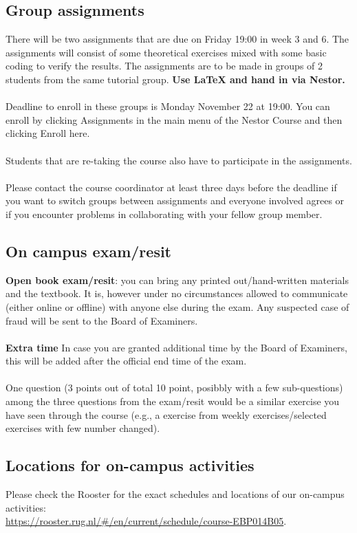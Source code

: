 \documentclass[openany]{article}
\begin{document}
\subsection{Group assignments}
There will be two assignments that are due on Friday
19:00 in week 3 and 6. The assignments will consist of some theoretical
exercises mixed with some basic coding to verify the results. The assignments
are to be made in groups of 2 students from the same tutorial group. \textbf{Use LaTeX and hand in via Nestor.} \\~\\
Deadline
to enroll in these groups is Monday November 22 at 19:00. You can
enroll by clicking Assignments in the main menu of the Nestor Course and
then clicking Enroll here.\\~\\
Students that are re-taking the course also have to participate in
the assignments.\\~\\
Please contact the course coordinator at least three days before the deadline if 
you want to switch groups between assignments and everyone involved agrees or
if you encounter problems in collaborating with your fellow group member.  

\subsection{On campus exam/resit}
\textbf{Open book exam/resit}: you can bring any printed out/hand-written materials and the textbook. It is, however under no circumstances allowed to
communicate (either online or offline) with anyone else during the exam.
Any suspected case of fraud will be sent to the Board of Examiners.\\~\\
\textbf{Extra time } In case you are granted additional time by the Board of Examiners, this will be added after the official end time of the exam.\\~\\
One question (3 points out of total 10 point, posibbly with a few sub-questions) among the three questions from the exam/resit would be a similar exercise you have seen through the course (e.g., a exercise from weekly exercises/selected exercises with few number changed). 

\subsection{Locations for on-campus activities}
Please check the Rooster for the exact schedules and locations of our on-campus activities:\\ \href{https://rooster.rug.nl/#/en/current/schedule/course-EBP014B05}{https://rooster.rug.nl/\#/en/current/schedule/course-EBP014B05}.
\end{document}
